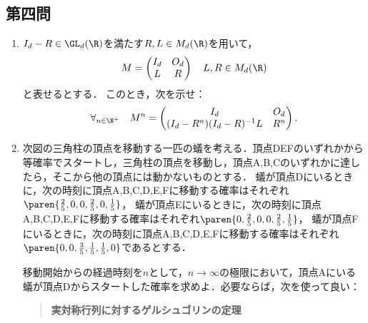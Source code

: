 \documentclass[uplatex,dvipdfmx]{jsarticle}
\begin{document}
\subsection{第四問}

\begin{tcolorbox}[colframe=ForestGreen, colback=ForestGreen!10!white,breakable,colbacktitle=ForestGreen!40!white,coltitle=black,fonttitle=\bfseries\sffamily,
    title=第４問]
    \begin{problem}\mbox{}\label{prob-21-8-4-Gershgorin}
        \begin{enumerate}
            \item $I_d-R\in\GL_d(\R)$を満たす$R,L\in M_d(\R)$を用いて，
            \[M=\begin{pmatrix}
                I_d&O_d\\L&R
            \end{pmatrix}\quad L,R\in M_d(\R)\]
            と表せるとする．
            このとき，次を示せ：
            \[\forall_{n\in\N^+}\quad M^n=\begin{pmatrix}I_d&O_d\\(I_d-R^n)(I_d-R)^{-1}L&R^n\end{pmatrix}.\]
            \item 次図の三角柱の頂点を移動する一匹の蟻を考える．頂点DEFのいずれかから等確率でスタートし，三角柱の頂点を移動し，頂点A,B,Cのいずれかに達したら，そこから他の頂点には動かないものとする．
            蟻が頂点Dにいるときに，次の時刻に頂点A,B,C,D,E,Fに移動する確率はそれぞれ$\paren{\frac{2}{5},0,0,\frac{2}{5},0,\frac{1}{5}}$，
            蟻が頂点Eにいるときに，次の時刻に頂点A,B,C,D,E,Fに移動する確率はそれぞれ$\paren{0,\frac{2}{5},0,0,\frac{2}{5},\frac{1}{5}}$，
            蟻が頂点Fにいるときに，次の時刻に頂点A,B,C,D,E,Fに移動する確率はそれぞれ$\paren{0,0,\frac{3}{5},\frac{1}{5},\frac{1}{5},0}$であるとする．
            
            \begin{center}
            \end{center}
    
            移動開始からの経過時刻を$n$として，$n\to\infty$の極限において，頂点Aにいる蟻が頂点Dからスタートした確率を求めよ．必要ならば，次を使って良い：
            \begin{quote}
                \textbf{実対称行列に対するゲルシュゴリンの定理}
    

\end{quote}
\end{enumerate}
\end{problem}
\end{tcolorbox}
\end{document}
